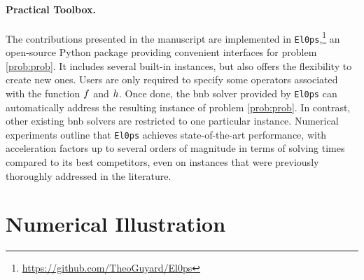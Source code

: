 \documentclass[11pt]{article}
\begin{document}
\paragraph{Practical Toolbox.}
The contributions presented in the manuscript are implemented in \texttt{El0ps},\footnote{\url{https://github.com/TheoGuyard/El0ps}} an open-source Python package providing convenient interfaces for problem \eqref{prob:prob}.
It includes several built-in instances, but also offers the flexibility to create new ones.
Users are only required to specify some operators associated with the function $f$ and $h$.
Once done, the \gls{bnb} solver provided by \texttt{El0ps} can automatically address the resulting instance of problem \eqref{prob:prob}.
In contrast, other existing \gls{bnb} solvers are restricted to one particular instance.
Numerical experiments outline that \texttt{El0ps} achieves state-of-the-art performance, with acceleration factors up to several orders of magnitude in terms of solving times compared to its best competitors, even on instances that were previously thoroughly addressed in the literature.

\section{Numerical Illustration}
\label{sec:numerics}
\end{document}
